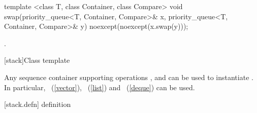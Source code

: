 %
%
\begin{itemdecl}
template <class T, class Container, class Compare>
  void swap(priority_queue<T, Container, Compare>& x,
            priority_queue<T, Container, Compare>& y) noexcept(noexcept(x.swap(y)));
\end{itemdecl}

\begin{itemdescr}
\pnum
\effects {}.
\end{itemdescr}

[stack]{Class template }

\pnum
{}%
Any sequence container supporting operations
,
and
can be used to instantiate
.
In particular,
~(\ref{vector}),
~(\ref{list})
and
~(\ref{deque})
can be used.

[stack.defn]{ definition}

